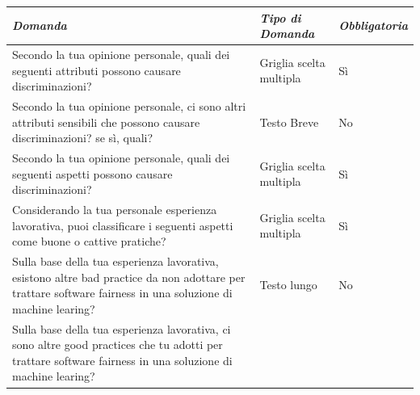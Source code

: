   \begin{longtable}{| p{} | p{} | p{} |} 
        \hline\textbf{\textit{Domanda}} & \textbf{\textit{Tipo di Domanda}} & \textbf{\textit{Obbligatoria}}\\
        \hline
        \endhead 
        
        \rowcolor{Gray}
        
       Secondo la tua opinione personale, quali dei seguenti attributi possono causare discriminazioni?  
        
        &  Griglia scelta multipla
        
        & Sì
        
       
        
        \\ \hline
        
         Secondo la tua opinione personale, ci sono altri attributi sensibili che possono causare discriminazioni? se sì, quali? 
        
        & Testo Breve
        
        & No
        
         \\ \hline
        \rowcolor{Gray}
        Secondo la tua opinione personale, quali dei seguenti aspetti possono causare discriminazioni? 
        
        & Griglia scelta multipla
        
        & Sì
        
        \\ \hline
       Considerando la tua personale esperienza lavorativa, puoi classificare i seguenti aspetti come buone o cattive pratiche?        
        
        &  Griglia scelta multipla
        
        & Sì
        
        \\ 
        \hline 
        \rowcolor{Gray}
       Sulla base della tua esperienza lavorativa, esistono altre bad practice da non adottare per trattare software fairness in  una soluzione di machine learing?
        
        & Testo lungo
        
        & No
        
        \\ 
        \hline 
       Sulla base della tua esperienza lavorativa, ci sono altre good practices che tu adotti per trattare software fairness in  una soluzione di machine learing?
        

\end{longtable}
